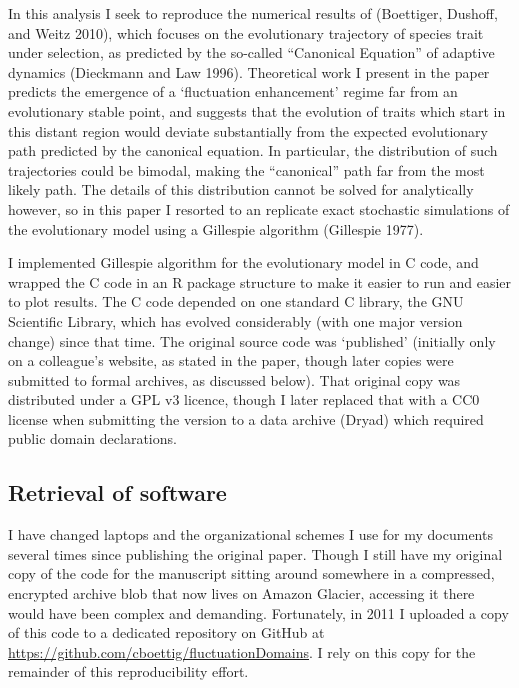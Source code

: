 \documentclass[
]{rescience}
\begin{document}
In this analysis I seek to reproduce the numerical results of
(Boettiger, Dushoff, and Weitz 2010), which focuses on the evolutionary
trajectory of species trait under selection, as predicted by the
so-called ``Canonical Equation'' of adaptive dynamics (Dieckmann and Law
1996). Theoretical work I present in the paper predicts the emergence of
a `fluctuation enhancement' regime far from an evolutionary stable
point, and suggests that the evolution of traits which start in this
distant region would deviate substantially from the expected
evolutionary path predicted by the canonical equation. In particular,
the distribution of such trajectories could be bimodal, making the
``canonical'' path far from the most likely path. The details of this
distribution cannot be solved for analytically however, so in this paper
I resorted to an replicate exact stochastic simulations of the
evolutionary model using a Gillespie algorithm (Gillespie 1977).

I implemented Gillespie algorithm for the evolutionary model in C code,
and wrapped the C code in an R package structure to make it easier to
run and easier to plot results. The C code depended on one standard C
library, the GNU Scientific Library, which has evolved considerably
(with one major version change) since that time. The original source
code was `published' (initially only on a colleague's website, as stated
in the paper, though later copies were submitted to formal archives, as
discussed below). That original copy was distributed under a GPL v3
licence, though I later replaced that with a CC0 license when submitting
the version to a data archive (Dryad) which required public domain
declarations.

\hypertarget{retrieval-of-software}{%
\subsection{Retrieval of software}\label{retrieval-of-software}}

I have changed laptops and the organizational schemes I use for my
documents several times since publishing the original paper. Though I
still have my original copy of the code for the manuscript sitting
around somewhere in a compressed, encrypted archive blob that now lives
on Amazon Glacier, accessing it there would have been complex and
demanding. Fortunately, in 2011 I uploaded a copy of this code to a
dedicated repository on GitHub at
\url{https://github.com/cboettig/fluctuationDomains}. I rely on this
copy for the remainder of this reproducibility effort.
\end{document}
